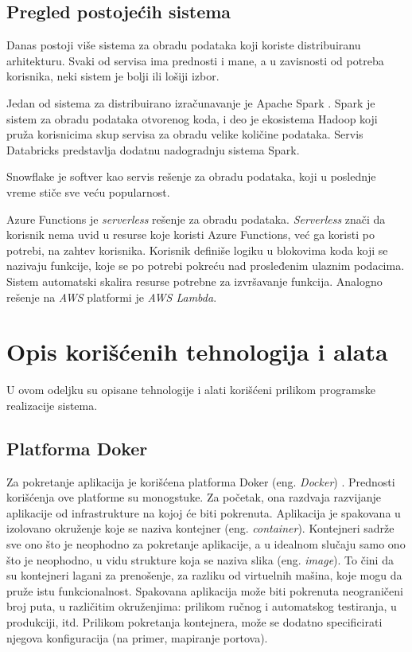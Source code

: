 \documentclass[12pt,oneside]{memoir}
\begin{document}
\subsection{Pregled postojećih sistema}
\label{sub:postojeca_resenja}

Danas postoji više sistema za obradu podataka koji koriste distribuiranu arhitekturu. Svaki od servisa ima prednosti i mane, a u zavisnosti od potreba korisnika, neki sistem je bolji ili lošiji izbor.

Jedan od sistema za distribuirano izračunavanje je Apache Spark \cite{Spark}. Spark je sistem za obradu podataka otvorenog koda, i deo je ekosistema Hadoop koji pruža korisnicima skup servisa za obradu velike količine podataka. Servis Databricks \cite{Databricks} predstavlja dodatnu nadogradnju sistema Spark.

Snowflake \cite{Snowflake} je softver kao servis rešenje za obradu podataka, koji u poslednje vreme stiče sve veću popularnost.

Azure Functions \cite{AzureFunctions} je \emph{serverless} rešenje za obradu podataka. \emph{Serverless} znači da korisnik nema uvid u resurse koje koristi Azure Functions, već ga koristi po potrebi, na zahtev korisnika. Korisnik definiše logiku u blokovima koda koji se nazivaju funkcije, koje se po potrebi pokreću nad prosleđenim ulaznim podacima. Sistem automatski skalira resurse potrebne za izvršavanje funkcija. Analogno rešenje na \emph{AWS} platformi je \emph{AWS Lambda}.

\section{Opis korišćenih tehnologija i alata}

U ovom odeljku su opisane tehnologije i alati korišćeni prilikom programske realizacije sistema.

\subsection{Platforma Doker}
\label{subs:docker_platform}

Za pokretanje aplikacija je korišćena platforma Doker (eng. \emph{Docker}) \cite{Docker}. Prednosti korišćenja ove platforme su monogstuke. Za početak, ona razdvaja razvijanje aplikacije od infrastrukture na kojoj će biti pokrenuta. Aplikacija je spakovana u izolovano okruženje koje se naziva kontejner (eng. \emph{container}). Kontejneri sadrže sve ono što je neophodno za pokretanje aplikacije, a u idealnom slučaju samo ono što je neophodno, u vidu strukture koja se naziva slika (eng. \emph{image}). To čini da su kontejneri lagani za prenošenje, za razliku od virtuelnih mašina, koje mogu da pruže istu funkcionalnost. Spakovana aplikacija može biti pokrenuta neograničeni broj puta, u različitim okruženjima: prilikom ručnog i automatskog testiranja, u produkciji, itd. Prilikom pokretanja kontejnera, može se dodatno specificirati njegova konfiguracija (na primer, mapiranje portova).
\end{document}
